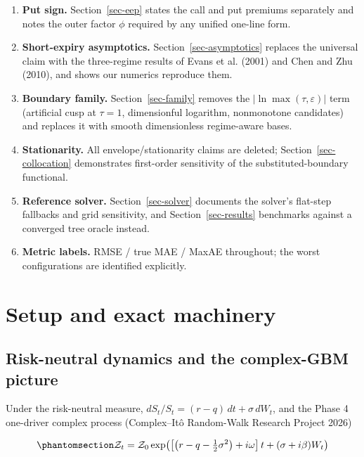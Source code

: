 \documentclass[
  english,
  10pt,
  letterpaper,
  DIV=11,
  numbers=noendperiod]{scrartcl}
\providecommand{\tightlist}{%
  \setlength{\itemsep}{0pt}\setlength{\parskip}{0pt}}
\begin{document}
\begin{enumerate}
\def\labelenumi{\arabic{enumi}.}
\tightlist
\item
  \textbf{Put sign.} Section~\ref{sec-eep} states the call and put
  premiums separately and notes the outer factor \(\phi\) required by
  any unified one-line form.
\item
  \textbf{Short-expiry asymptotics.} Section~\ref{sec-asymptotics}
  replaces the universal claim with the three-regime results of Evans et
  al. (2001) and Chen and Zhu (2010), and shows our numerics reproduce
  them.
\item
  \textbf{Boundary family.} Section~\ref{sec-family} removes the
  \(|\ln\max(\tau,\varepsilon)|\) term (artificial cusp at \(\tau=1\),
  dimensionful logarithm, nonmonotone candidates) and replaces it with
  smooth dimensionless regime-aware bases.
\item
  \textbf{Stationarity.} All envelope/stationarity claims are deleted;
  Section~\ref{sec-collocation} demonstrates first-order sensitivity of
  the substituted-boundary functional.
\item
  \textbf{Reference solver.} Section~\ref{sec-solver} documents the
  solver's flat-step fallbacks and grid sensitivity, and
  Section~\ref{sec-results} benchmarks against a converged tree oracle
  instead.
\item
  \textbf{Metric labels.} RMSE / true MAE / MaxAE throughout; the worst
  configurations are identified explicitly.
\end{enumerate}

\section{Setup and exact machinery}\label{sec-setup}

\subsection{Risk-neutral dynamics and the complex-GBM
picture}\label{sec-geometry}

Under the risk-neutral measure, \(dS_t/S_t=(r-q)\,dt+\sigma\,dW_t\), and
the Phase 4 one-driver complex process (Complex--Itô Random-Walk
Research Project 2026)

\begin{equation}\protect\phantomsection\label{eq-complex-gbm}{
\mathcal Z_t
=
\mathcal Z_0
\exp\!\left(
\left[\left(r-q-\tfrac12\sigma^2\right)+i\omega\right]t
+(\sigma+i\beta)W_t
\right)
}\end{equation}
\end{document}
